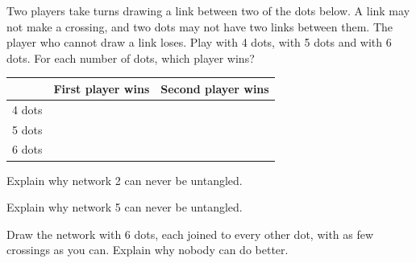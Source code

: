 \documentclass[12pt]{article}
\renewcommand{\tallyrow}[1]{\rule[-0.6cm]{0pt}{1.6cm}#1 & & \\ \hline}
\begin{document}


\newpage
\problem\label{game}Two players take turns drawing a link between two of the dots below. A link may not make a crossing, and two dots may not have two links between them. The player who cannot draw a link loses. Play with 4 dots, with 5 dots and with 6 dots. For each number of dots, which player wins?

\vspace{10pt}
\noindent\begin{tabular}{|>{\raggedright\arraybackslash}m{2.6cm}|m{6.6cm}|m{6.6cm}|}
\hline
\rule[-0.3cm]{0pt}{0.9cm} & \centering First player wins & \centering\arraybackslash Second player wins \\ \hline
\tallyrow{4 dots}
\tallyrow{5 dots}
\tallyrow{6 dots}
\end{tabular}

\vspace{16pt}
\noindent\hfill\hfill

\vspace{14pt}
\noindent\hfill\hfill

\newpage
\problem Explain why network 2 can never be untangled.

\vspace{10pt}
\noindent\begin{minipage}[t]{7.4cm}\vspace{0pt}
\answerbox{7.4cm}{8.6cm}
\end{minipage}\hfill
\begin{minipage}[t]{9.8cm}\vspace{0pt}
\end{minipage}

\vspace{6pt}
\problem Explain why network 5 can never be untangled.

\vspace{10pt}
\noindent\begin{minipage}[t]{7.4cm}\vspace{0pt}
\answerbox{7.4cm}{8.6cm}
\end{minipage}\hfill
\begin{minipage}[t]{9.8cm}\vspace{0pt}
\end{minipage}

\newpage


\newpage
\problem Draw the network with 6 dots, each joined to every other dot, with as few crossings as you can. Explain why nobody can do better.
\end{document}
